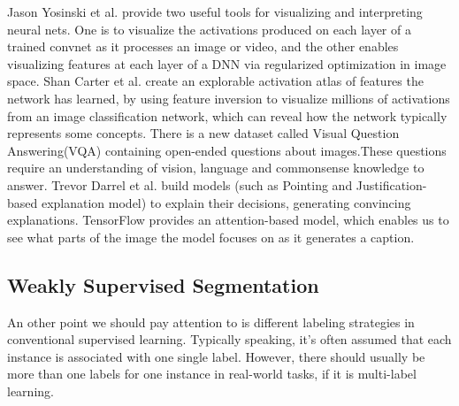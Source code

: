 \documentclass[10pt,twocolumn,letterpaper]{article}
\begin{document}
Jason Yosinski et al. provide two useful tools for visualizing and interpreting neural nets. 
One is to visualize  the activations produced on each layer of a trained convnet as it 
processes an image or video, and the other enables visualizing 
features at each layer of a DNN via regularized optimization in image space.
Shan Carter et al. create an explorable activation atlas of features the network has learned, by using feature inversion to visualize millions of activations from an image classification network, which can reveal how the network typically represents some concepts.
There is a new dataset called Visual Question Answering(VQA) containing open-ended questions about images.These questions require an understanding of vision, language and commonsense knowledge to answer.
Trevor Darrel et al. build  models (such as Pointing and Justification-based explanation model) to explain their decisions, generating convincing explanations.
TensorFlow provides an attention-based model, which enables us to see what parts of the image the model focuses on as it generates a caption.

\subsection{Weakly Supervised Segmentation}

An other point we should pay attention to is different labeling strategies in conventional supervised learning.
Typically speaking, it's often assumed that each instance is associated with one single label. However, there should usually be more than one labels for one instance in real-world tasks, if it is multi-label learning.

\end{document}
